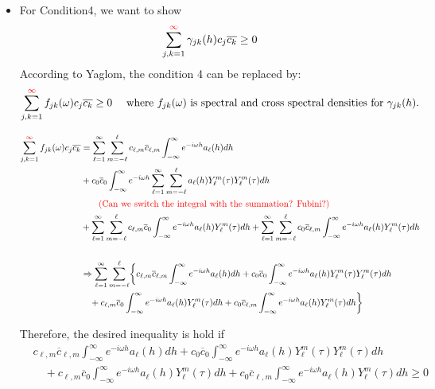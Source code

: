 \documentclass[11pt]{article}
\begin{document}
\begin{itemize}
\item
For Condition4, we want to show\\
$$\sum_{j,k=1}^{{\color{red}\infty}} \gamma_{jk}(h) c_j \overline{c_k} \ge 0$$
According to Yaglom, the condition 4 can be replaced by:\\
$$\sum_{j,k=1}^{{\color{red}\infty}} f_{jk}(\omega) c_j \overline{c_k} \ge 0 \quad \text{ where } f_{jk}(\omega) \text{ is spectral and cross spectral densities for } \gamma_{jk}(h).$$

\begin{align*}
\sum_{j,k=1}^{{\color{red}\infty}} f_{jk}(\omega) c_j \overline{c_k} &= \sum_{\ell=1}^\infty \sum_{m=-\ell}^{\ell} c_{\ell,m} \overline{c}_{\ell,m} \int_{-\infty}^{\infty} e^{-i \omega h}a_\ell(h) dh\\ 
&+ c_{0} \overline{c}_{0} \int_{-\infty}^{\infty} e^{-i \omega h} \sum_{\ell=1}^\infty \sum_{m=-\ell}^{\ell} a_\ell(h) Y_{\ell}^m(\tau) Y_{\ell}^m(\tau) dh\\ 
&\quad \quad \text{{\color{red}(Can we switch the integral with the summation? Fubini?)}}\\
&+ \sum_{\ell=1}^\infty \sum_{m=-\ell}^{\ell} c_{\ell,m} \overline{c}_{0} \int_{-\infty}^{\infty} e^{-i \omega h}a_\ell(h) Y_{\ell}^m(\tau) dh + \sum_{\ell=1}^\infty \sum_{m=-\ell}^{\ell} c_{0} \overline{c}_{\ell,m} \int_{-\infty}^{\infty} e^{-i \omega h}a_\ell(h) Y_{\ell}^m(\tau) dh\\
\\
&\Rightarrow \sum_{\ell=1}^\infty \sum_{m=-\ell}^{\ell} \biggl\{ c_{\ell,m} \overline{c}_{\ell,m} \int_{-\infty}^{\infty} e^{-i \omega h}a_\ell(h) dh + c_{0} \overline{c}_{0} \int_{-\infty}^{\infty} e^{-i \omega h} a_\ell(h) Y_{\ell}^m(\tau) Y_{\ell}^m(\tau) dh\\
&\quad + c_{\ell,m} \overline{c}_{0} \int_{-\infty}^{\infty} e^{-i \omega h}a_\ell(h) Y_{\ell}^m(\tau) dh + c_{0} \overline{c}_{\ell,m} \int_{-\infty}^{\infty} e^{-i \omega h}a_\ell(h) Y_{\ell}^m(\tau) dh \biggl\}\\
\end{align*}

Therefore, the desired inequality is hold if\\
\begin{align*}
&c_{\ell,m} \overline{c}_{\ell,m} \int_{-\infty}^{\infty} e^{-i \omega h}a_\ell(h) dh + c_{0} \overline{c}_{0} \int_{-\infty}^{\infty} e^{-i \omega h} a_\ell(h) Y_{\ell}^m(\tau) Y_{\ell}^m(\tau) dh\\
&\quad + c_{\ell,m} \overline{c}_{0} \int_{-\infty}^{\infty} e^{-i \omega h}a_\ell(h) Y_{\ell}^m(\tau) dh + c_{0} \overline{c}_{\ell,m} \int_{-\infty}^{\infty} e^{-i \omega h}a_\ell(h) Y_{\ell}^m(\tau) dh \ge 0
\end{align*}


\end{itemize}
\end{document}
